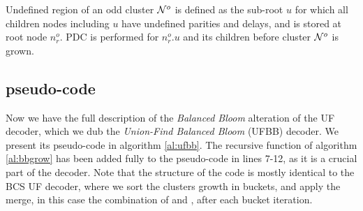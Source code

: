 \begin{theorem}\label{the:delayonce}
  Undefined region of an odd cluster $\mathcal{N}^o$ is defined as the sub-root $u$ for which all children nodes including $u$ have undefined parities and delays, and is stored at root node $n^o_r$. PDC is performed for $n^o_r.u$ and its children before cluster $\mathcal{N}^o$ is grown.
\end{theorem}

\subsection{pseudo-code}
Now we have the full description of the \emph{Balanced Bloom} alteration of the UF decoder, which we dub the \emph{Union-Find Balanced Bloom} (UFBB) decoder. We present its pseudo-code in algorithm \ref{al:ufbb}. The recursive  function of algorithm \ref{al:bbgrow} has been added fully to the pseudo-code in lines 7-12, as it is a crucial part of the decoder. Note that the structure of the code is mostly identical to the BCS UF decoder, where we sort the clusters growth in buckets, and apply the merge, in this case the combination of  and , after each bucket iteration.

\begin{algo}[algotitle=Union-Find Balanced Bloom (UFBB), label=al:ufbb]
\begin{algorithm}[H]

\KwData{\buckets}

\BlankLine

\end{algorithm}
\end{algo}


